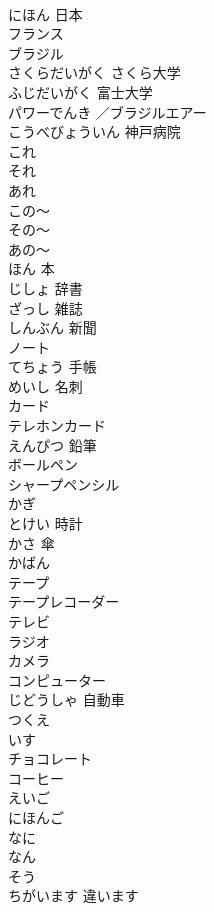 \documentclass[8pt]{extreport}
\begin{document}
\begin{CJK}{UTF8}{min}
\\	にほん	日本	
\\	フランス			
\\	ブラジル			
\\	さくらだいがく	さくら大学	
\\	ふじだいがく	富士大学	
\\	パワーでんき ／ブラジルエアー			
\\	こうべびょういん	神戸病院	
\\	これ			
\\	それ			
\\	あれ			
\\	この～			
\\	その～			
\\	あの～			
\\	ほん	本	
\\	じしょ	辞書	
\\	ざっし	雑誌	
\\	しんぶん	新聞	
\\	ノート			
\\	てちょう	手帳	
\\	めいし	名刺	
\\	カード			
\\	テレホンカード			
\\	えんぴつ	鉛筆	
\\	ボールペン			
\\	シャープペンシル			
\\	かぎ			
\\	とけい	時計	
\\	かさ	傘	
\\	かばん			
\\	[カセット]テープ			
\\	テープレコーダー			
\\	テレビ			
\\	ラジオ			
\\	カメラ			
\\	コンピューター			
\\	じどうしゃ	自動車	
\\	つくえ			
\\	いす			
\\	チョコレート			
\\	コーヒー			
\\	えいご			
\\	にほんご			
\\	なに			
\\	なん			
\\	そう			
\\	ちがいます	違います	

\end{CJK}
\end{document}
